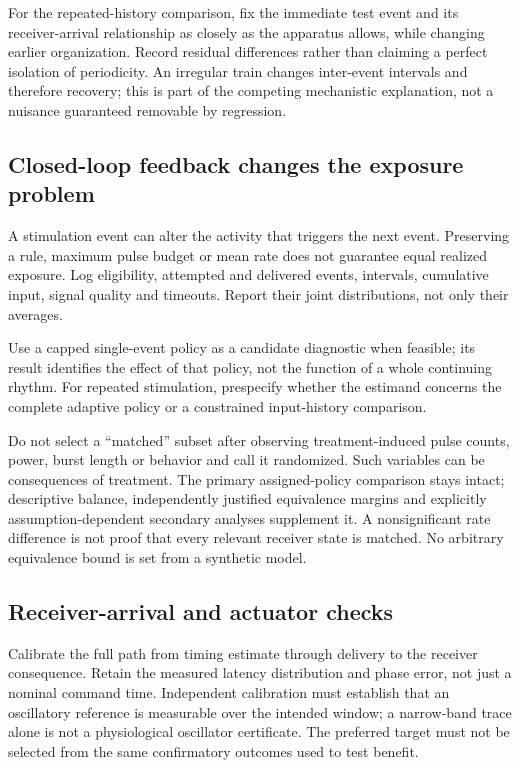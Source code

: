 \documentclass[
  american,
  11pt,
  letterpaper,
]{article}
\begin{document}
For the repeated-history comparison, fix the immediate test event and its receiver-arrival relationship as closely as the apparatus allows, while changing earlier organization. Record residual differences rather than claiming a perfect isolation of periodicity. An irregular train changes inter-event intervals and therefore recovery; this is part of the competing mechanistic explanation, not a nuisance guaranteed removable by regression.

\subsection{Closed-loop feedback changes the exposure problem}\label{closed-loop-feedback-changes-the-exposure-problem}

A stimulation event can alter the activity that triggers the next event. Preserving a rule, maximum pulse budget or mean rate does not guarantee equal realized exposure. Log eligibility, attempted and delivered events, intervals, cumulative input, signal quality and timeouts. Report their joint distributions, not only their averages.

Use a capped single-event policy as a candidate diagnostic when feasible; its result identifies the effect of that policy, not the function of a whole continuing rhythm. For repeated stimulation, prespecify whether the estimand concerns the complete adaptive policy or a constrained input-history comparison.

Do not select a ``matched'' subset after observing treatment-induced pulse counts, power, burst length or behavior and call it randomized. Such variables can be consequences of treatment. The primary assigned-policy comparison stays intact; descriptive balance, independently justified equivalence margins and explicitly assumption-dependent secondary analyses supplement it. A nonsignificant rate difference is not proof that every relevant receiver state is matched. No arbitrary equivalence bound is set from a synthetic model.

\subsection{Receiver-arrival and actuator checks}\label{receiver-arrival-and-actuator-checks}

Calibrate the full path from timing estimate through delivery to the receiver consequence. Retain the measured latency distribution and phase error, not just a nominal command time. Independent calibration must establish that an oscillatory reference is measurable over the intended window; a narrow-band trace alone is not a physiological oscillator certificate. The preferred target must not be selected from the same confirmatory outcomes used to test benefit.
\end{document}
